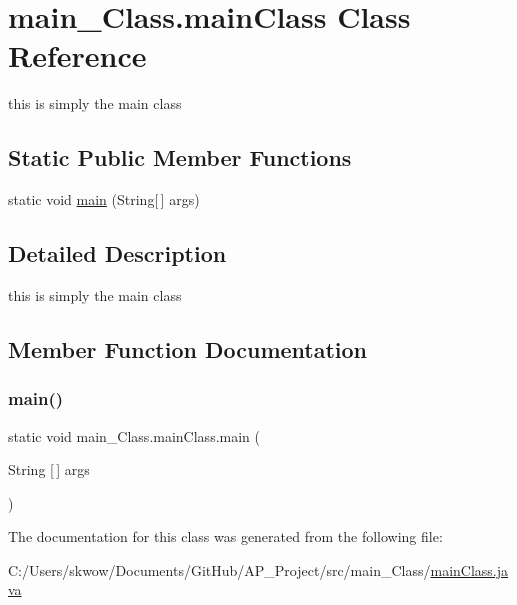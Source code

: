 \hypertarget{classmain___class_1_1main_class}{}\section{main\+\_\+\+Class.\+main\+Class Class Reference}
\label{classmain___class_1_1main_class}


this is simply the main class  


\subsection*{Static Public Member Functions}
\begin{DoxyCompactItemize}
\item 
static void \hyperlink{classmain___class_1_1main_class_ab3827b8cc7f9a5b8f432ee476700b844}{main} (String\mbox{[}$\,$\mbox{]} args)
\end{DoxyCompactItemize}


\subsection{Detailed Description}
this is simply the main class 

\subsection{Member Function Documentation}
\hypertarget{classmain___class_1_1main_class_ab3827b8cc7f9a5b8f432ee476700b844}{}\label{classmain___class_1_1main_class_ab3827b8cc7f9a5b8f432ee476700b844} 
\subsubsection{\texorpdfstring{main()}{main()}}
{\footnotesize\ttfamily static void main\+\_\+\+Class.\+main\+Class.\+main (\begin{DoxyParamCaption}\item[{String \mbox{[}$\,$\mbox{]}}]{args }\end{DoxyParamCaption})\hspace{0.3cm}{\ttfamily [static]}}



The documentation for this class was generated from the following file\+:\begin{DoxyCompactItemize}
\item 
C\+:/\+Users/skwow/\+Documents/\+Git\+Hub/\+A\+P\+\_\+\+Project/src/main\+\_\+\+Class/\hyperlink{main_class_8java}{main\+Class.\+java}\end{DoxyCompactItemize}
